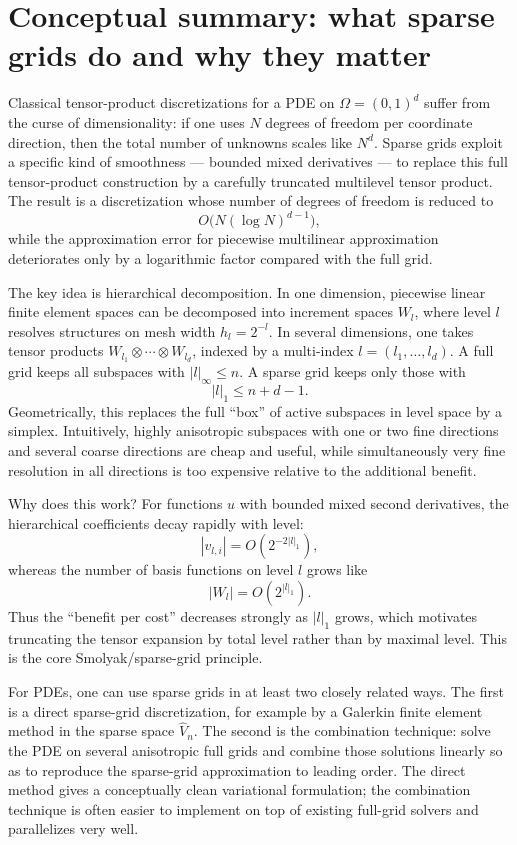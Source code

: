 \documentclass[11pt,a4paper]{report}
\begin{document}
\tableofcontents
\vspace{2em}

\chapter{Conceptual summary: what sparse grids do and why they matter}

Classical tensor-product discretizations for a PDE on $\Omega=(0,1)^d$ suffer from the curse of dimensionality: if one uses $N$ degrees of freedom per coordinate direction, then the total number of unknowns scales like $N^d$. Sparse grids exploit a specific kind of smoothness --- bounded mixed derivatives --- to replace this full tensor-product construction by a carefully truncated multilevel tensor product. The result is a discretization whose number of degrees of freedom is reduced to
$$
O\!\bigl(N(\log N)^{d-1}\bigr),
$$
while the approximation error for piecewise multilinear approximation deteriorates only by a logarithmic factor compared with the full grid.

The key idea is hierarchical decomposition. In one dimension, piecewise linear finite element spaces can be decomposed into increment spaces $W_l$, where level $l$ resolves structures on mesh width $h_l=2^{-l}$. In several dimensions, one takes tensor products $W_{l_1}\otimes\cdots\otimes W_{l_d}$, indexed by a multi-index $l=(l_1,\dots,l_d)$. A full grid keeps all subspaces with $|l|_\infty\le n$. A sparse grid keeps only those with
$$
|l|_1 \le n+d-1.
$$
Geometrically, this replaces the full ``box'' of active subspaces in level space by a simplex. Intuitively, highly anisotropic subspaces with one or two fine directions and several coarse directions are cheap and useful, while simultaneously very fine resolution in all directions is too expensive relative to the additional benefit.

Why does this work? For functions $u$ with bounded mixed second derivatives, the hierarchical coefficients decay rapidly with level:
$$
|v_{l,i}| = O(2^{-2|l|_1}),
$$
whereas the number of basis functions on level $l$ grows like
$$
|W_l| = O(2^{|l|_1}).
$$
Thus the ``benefit per cost'' decreases strongly as $|l|_1$ grows, which motivates truncating the tensor expansion by total level rather than by maximal level. This is the core Smolyak/sparse-grid principle.

For PDEs, one can use sparse grids in at least two closely related ways. The first is a direct sparse-grid discretization, for example by a Galerkin finite element method in the sparse space $\widehat V_n$. The second is the combination technique: solve the PDE on several anisotropic full grids and combine those solutions linearly so as to reproduce the sparse-grid approximation to leading order. The direct method gives a conceptually clean variational formulation; the combination technique is often easier to implement on top of existing full-grid solvers and parallelizes very well.
\end{document}
